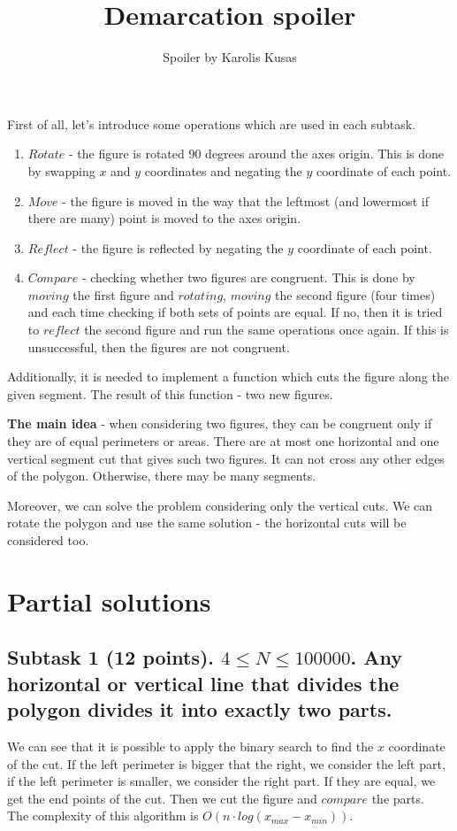 \documentclass[a4paper,12pt]{article}
\title{Demarcation spoiler}
\date{}
\author{Spoiler by Karolis Kusas}
\begin{document}
\maketitle

\noindent First of all, let's introduce some operations which are used in each subtask.

\begin{enumerate}
\item $Rotate$ - the figure is rotated 90 degrees around the axes origin. 
This is done by swapping $x$ and $y$ coordinates and negating the $y$ coordinate of each point.

\item $Move$ - the figure is moved in the way that the leftmost (and lowermost if there are many) point is moved to the axes origin.

\item $Reflect$ - the figure is reflected by negating the $y$ coordinate of each point.

\item $Compare$ - checking whether two figures are congruent. This is done by $moving$ the first figure 
and $rotating$, $moving$ the second figure (four times) and each time checking if both sets of points are equal.
If no, then it is tried to $reflect$ the second figure and run the same operations once again. If this is unsuccessful, then
the figures are not congruent.
\end{enumerate}

Additionally, it is needed to implement a function which cuts the figure along the given segment. The result of this function - two new figures.

\textbf{The main idea} - when considering two figures, they can be congruent only if they are of equal perimeters or areas. 
There are at most one horizontal and one vertical segment cut that gives such two figures. It can not cross any other edges of the polygon.
Otherwise, there may be many segments.

Moreover, we can solve the problem considering only the vertical cuts. 
We can rotate the polygon and use the same solution - the horizontal cuts will be considered too.

\section*{Partial solutions}

\subsection*{Subtask 1 (12 points). $4 \le N \le 100 000$. Any horizontal or vertical line that divides the
polygon divides it into exactly two parts.}
We can see that it is possible to apply the binary search to find the $x$ coordinate of the cut. If the left perimeter is bigger that the right, 
we consider the left part, if the left perimeter is smaller, we consider the right part. If they are equal, we get the end points of the cut.
Then we cut the figure and $compare$ the parts.
\\The complexity of this algorithm is $O(n \cdot log(x_{max} - x_{min}))$.
\end{document}
